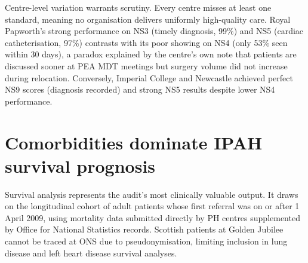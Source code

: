 \documentclass[11pt,a4paper]{article}
\begin{document}
Centre-level variation warrants scrutiny. Every centre misses at least one standard, meaning no organisation delivers uniformly high-quality care. Royal Papworth's strong performance on NS3 (timely diagnosis, 99\%) and NS5 (cardiac catheterisation, 97\%) contrasts with its poor showing on NS4 (only 53\% seen within 30 days), a paradox explained by the centre's own note that patients are discussed sooner at PEA MDT meetings but surgery volume did not increase during relocation. Conversely, Imperial College and Newcastle achieved perfect NS9 scores (diagnosis recorded) and strong NS5 results despite lower NS4 performance.

\begin{table}[H]
\centering
\small
\caption{Centre performance on key variable standards (2018--19)}
\end{table}

\section{Comorbidities dominate IPAH survival prognosis}

Survival analysis represents the audit's most clinically valuable output. It draws on the longitudinal cohort of adult patients whose first referral was on or after 1 April 2009, using mortality data submitted directly by PH centres supplemented by Office for National Statistics records. Scottish patients at Golden Jubilee cannot be traced at ONS due to pseudonymisation, limiting inclusion in lung disease and left heart disease survival analyses.
\end{document}
